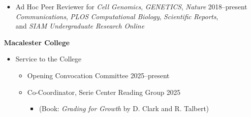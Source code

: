 \documentclass[margin]{res}
\begin{document}
\begin{resume}
\begin{itemize}
	\item Ad Hoc Peer Reviewer for \textit{Cell Genomics}, \textit{GENETICS},  \textit{Nature }  \hfill 2018--present \\ \textit{Communications}, \textit{PLOS Computational Biology},  \textit{Scientific} \textit{Reports}, \\ and \textit{SIAM Undergraduate Research Online} 
	\end{itemize}
	
\textbf{Macalester College}
	\begin{itemize} %
	
	\item Service to the College
		\begin{itemize}
		
		\item Opening Convocation Committee \hfill 2025--present
		
		\item Co-Coordinator, Serie Center Reading Group  \hfill 2025
			\begin{itemize}[leftmargin=-0in] \vspace{-0.2cm}
			\item[] \begin{footnotesize}(Book: \textit{Grading for Growth} by D. Clark and R. Talbert) \end{footnotesize}
			\end{itemize} 
		

\end{itemize}
\end{itemize}
\end{resume}
\end{document}
